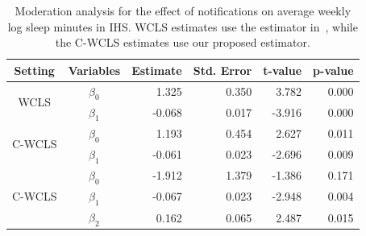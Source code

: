 \documentclass[12pt]{article}
\begin{document}



\begin{table}[!th]
\centering
\begin{tabular}{c | crrrr}
\hline
Setting & Variables & Estimate & Std. Error & t-value & p-value \\ \hline
\multirow{2}{*}{WCLS} & $\beta_0$ & 1.325 & 0.350 & 3.782 & 0.000 \\
& $\beta_1$ & -0.068 & 0.017 & -3.916 & 0.000 \\ \hline
\multirow{2}{*}{C-WCLS} & $\beta_0$ & 1.193 & 0.454 & 2.627 & 0.011 \\
& $\beta_1$ & -0.061 & 0.023 & -2.696 & 0.009 \\ \hline
\multirow{3}{*}{C-WCLS} & $\beta_0$ & -1.912 & 1.379 & -1.386 & 0.171  \\
& $\beta_1$ & -0.067 & 0.023 & -2.948 & 0.004 \\
& $\beta_2$ & 0.162 & 0.065 & 2.487 & 0.015 \\ \hline
\end{tabular}
\caption{Moderation analysis for the effect of notifications on average weekly log sleep minutes in IHS. WCLS estimates use the estimator in~\cite{Boruvkaetal}, while the C-WCLS estimates use our proposed estimator.}
\label{tab:IHS_directsleep}
\end{table}
\end{document}
